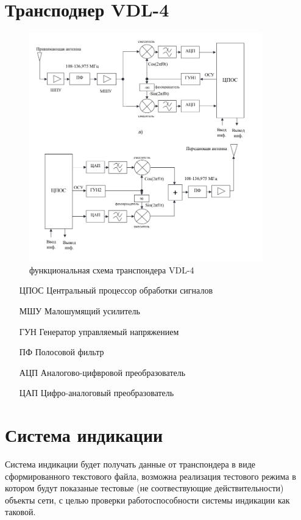 \documentclass[a4paper,12pt]{report} %
\begin{document}
\section{Трансподнер VDL-4}
\begin{figure}[!ht]
  \includegraphics[width=0.9\textwidth]{vdl4}
  \caption{функциональная схема транспондера VDL-4}
\end{figure}

\begin{itemize}
\item [ЦПОС] Центральный процессор обработки сигналов
\item [МШУ] Малошумящий усилитель
\item [ГУН] Генератор управляемый напряжением
\item [ПФ] Полосовой фильтр
\item [АЦП] Аналогово-цифвровой преобразователь
\item [ЦАП] Цифро-аналоговый преобразователь
\end{itemize}
\newpage

\section{Система индикации}
Система индикации будет получать данные от транспондера в виде сформированного
текстового файла, возможна реализация тестового режима в котором будут показаные
тестовые (не соотвествующие действительности) объекты сети, с целью проверки
работоспособности системы индикации как таковой.
\end{document}
